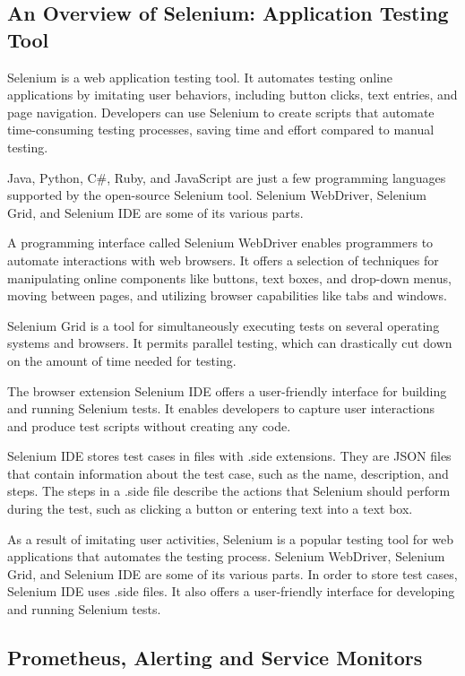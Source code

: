 \subsection{An Overview of Selenium: Application Testing Tool}

Selenium is a web application testing tool. It automates testing online applications by imitating user behaviors, including button clicks, text entries, and page navigation. Developers can use Selenium to create scripts that automate time-consuming testing processes, saving time and effort compared to manual testing.

Java, Python, C\#, Ruby, and JavaScript are just a few programming languages supported by the open-source Selenium tool. Selenium WebDriver, Selenium Grid, and Selenium IDE are some of its various parts.

A programming interface called Selenium WebDriver enables programmers to automate interactions with web browsers. It offers a selection of techniques for manipulating online components like buttons, text boxes, and drop-down menus, moving between pages, and utilizing browser capabilities like tabs and windows.

Selenium Grid is a tool for simultaneously executing tests on several operating systems and browsers. It permits parallel testing, which can drastically cut down on the amount of time needed for testing.

The browser extension Selenium IDE offers a user-friendly interface for building and running Selenium tests. It enables developers to capture user interactions and produce test scripts without creating any code.

Selenium IDE stores test cases in files with .side extensions. They are JSON files that contain information about the test case, such as the name, description, and steps. The steps in a .side file describe the actions that Selenium should perform during the test, such as clicking a button or entering text into a text box.

As a result of imitating user activities, Selenium is a popular testing tool for web applications that automates the testing process. Selenium WebDriver, Selenium Grid, and Selenium IDE are some of its various parts. In order to store test cases, Selenium IDE uses .side files. It also offers a user-friendly interface for developing and running Selenium tests.


\subsection{Prometheus, Alerting and Service Monitors}


